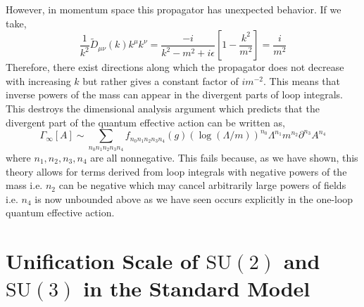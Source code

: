 \documentclass[12pt]{article}
\begin{document}
However, in momentum space this propagator has unexpected behavior. If we take,
\[ \frac{1}{k^2} \tilde{D}_{\mu \nu}(k) k^\mu k^\nu = \frac{-i}{k^2 - m^2 + i \epsilon} \left[ 1 - \frac{k^2}{m^2} \right] = \frac{i}{m^2} \]
Therefore, there exist directions along which the propagator does not decrease with increasing $k$ but rather gives a constant factor of $i m^{-2}$. This means that inverse powers of the mass can appear in the divergent parts of loop integrals. This destroys the dimensional analysis argument which predicts that the divergent part of the quantum effective action can be written as,
\[ \Gamma_{ \infty } [ A ] \sim \sum _ { n _ { 0 } n _ { 1 } n _ { 2 } n _ { 3 } n _ { 4 } } f _ { n _ { 0 } n _ { 1 } n _ { 2 } n _ { 3 } n _ { 4 } } ( g ) ( \log ( \Lambda / m ) ) ^ { n _ { 0 } } \Lambda ^ { n _ { 1 } } m ^ { n _ { 2 } } \partial ^ { n _ { 3 } } A ^ { n _ { 4 } } \]
where $n_1, n_2, n_3, n_4$ are all nonnegative. This fails because, as we have shown, this theory allows for terms derived from loop integrals with negative powers of the mass i.e. $n_2$ can be negative which may cancel arbitrarily large powers of fields i.e. $n_4$ is now unbounded above as we have seen occurs explicitly in the one-loop quantum effective action. 

\section{Unification Scale of $\mathrm{SU}(2)$ and $\mathrm{SU}(3)$ in the Standard Model}
\end{document}
